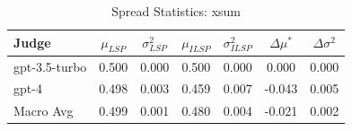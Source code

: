 \begin{table}[h]
\centering
\caption{Spread Statistics: xsum}
\label{tab:spread_xsum}
\begin{tabular}{l c c c c c c}
\hline
Judge & $\mu_{LSP}$ & $\sigma^2_{LSP}$ & $\mu_{ILSP}$ & $\sigma^2_{ILSP}$ & $\Delta\mu^*$ & $\Delta\sigma^2$ \\
\hline
gpt-3.5-turbo & 0.500 & 0.000 & 0.500 & 0.000 & 0.000 & 0.000 \\
gpt-4 & 0.498 & 0.003 & 0.459 & 0.007 & -0.043 & 0.005 \\
\hline
Macro Avg & 0.499 & 0.001 & 0.480 & 0.004 & -0.021 & 0.002 \\
\hline
\end{tabular}
\end{table}